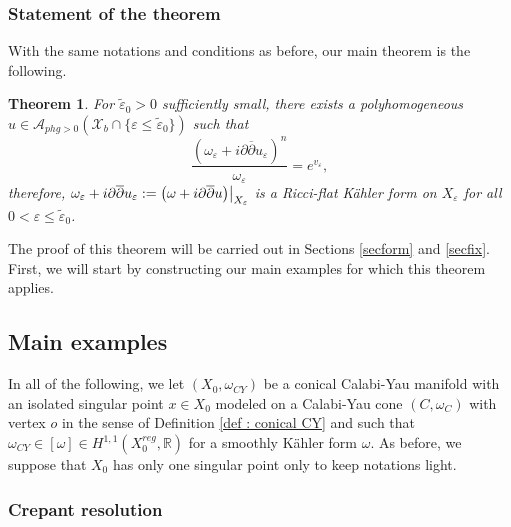 \documentclass[a4paper,11pt]{article}
\newcounter{mythm}[section]
\newtheorem{tm}[mythm]{Theorem}
\def\R{\mathbb{R}}
\newcommand\restr[2]{{%
  \left.\kern-\nulldelimiterspace %
  #1 %
  \littletaller %
  \right|_{#2} %
  }}
\newcommand{\littletaller}{\mathchoice{\vphantom{\big|}}{}{}{}}
\begin{document}
\subsubsection{Statement of the theorem}  
 With the same notations and conditions as before, our main theorem is the following.
\begin{tm} \label{main} For $\tilde \varepsilon_0 >0$ sufficiently small, there exists a polyhomogeneous $u \in \mathcal{A}_{phg >0}\left(\mathcal{X}_b \cap \{ \varepsilon \leq \tilde \varepsilon_0 \}\right)$ such that
$$
\frac{\left( \omega_\varepsilon + i \partial \overline{\partial} u_\varepsilon \right)^n}{\omega_\varepsilon} = e^{ v_\varepsilon},
$$
therefore, $\omega_\varepsilon + i \partial \overline{\partial} u_\varepsilon:= \restr{\left( \omega + i \partial \overline{\partial} u \right)}{X_\varepsilon}$ is a Ricci-flat Kähler form on $X_\varepsilon$ for all $0 < \varepsilon \leq \tilde \varepsilon_0$.
\end{tm}
The proof of this theorem will be carried out in Sections \ref{secform} and \ref{secfix}. First, we will start by constructing our main examples for which this theorem applies. 
\subsection{Main examples} \label{main examples}
In all of the following, we let $(X_0, \omega_{CY})$ be a conical Calabi-Yau manifold with an isolated singular point $x \in X_0 $ modeled on a Calabi-Yau cone $(C, \omega_C)$ with vertex $o$ in the sense of Definition \ref{def : conical CY} and such that $\omega_{CY} \in [\omega] \in H^{1,1}(X_0^{reg}, \R)$ for a smoothly Kähler form $\omega$. As before, we suppose that $X_0$ has only one singular point only to keep notations light.
\subsubsection{Crepant resolution} \label{crepant resolution}
\end{document}
